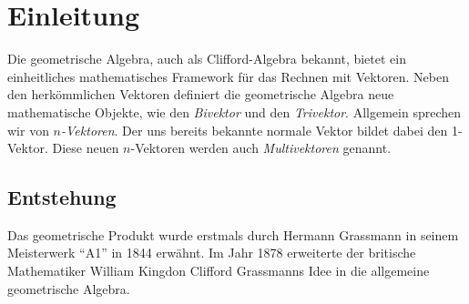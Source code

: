 %
%
%
%
\section{Einleitung\label{geoalgebra:section:einfuehrung}}
Die geometrische Algebra, auch als Clifford-Algebra bekannt, bietet ein einheitliches mathematisches
Framework für das Rechnen mit Vektoren.
Neben den herkömmlichen Vektoren definiert die geometrische
Algebra neue mathematische Objekte, wie den \emph{Bivektor} und den \emph{Trivektor}. Allgemein sprechen wir von
\emph{$n$-Vektoren}.
Der uns bereits bekannte normale Vektor bildet dabei den 1-Vektor. Diese neuen $n$-Vektoren werden auch
\emph{Multivektoren} genannt.

\subsection{Entstehung}
Das geometrische Produkt wurde erstmals durch Hermann Grassmann in seinem Meisterwerk ``A1'' \cite{geoalgebra:grassmann1844lineale} in 1844
erwähnt. Im Jahr 1878 erweiterte der britische Mathematiker William Kingdon Clifford Grassmanns Idee
in die allgemeine geometrische Algebra. 

